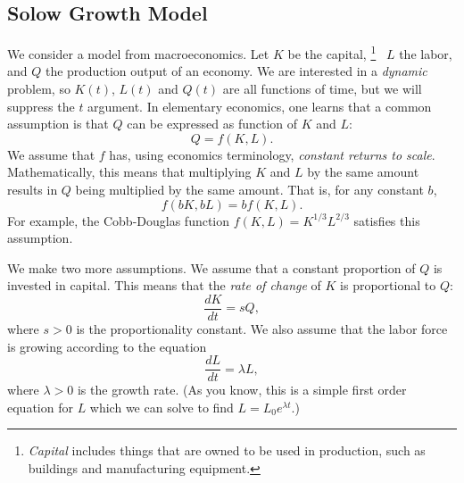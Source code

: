 \documentclass{book}
\begin{document}
\subsection{Solow Growth Model}
We consider a model from macroeconomics.
Let $K$ be the capital,%
\footnote{\emph{Capital} includes things that are owned to be used
in production, such as buildings and manufacturing equipment.}%
~$L$ the labor, and $Q$ the production output of an economy.
We are interested in a \emph{dynamic} problem, so $K(t)$, $L(t)$ and
$Q(t)$ are all functions of time, but we will suppress the $t$ argument.
In elementary economics, one learns that a common assumption is that
$Q$ can be expressed as function of $K$ and $L$:
\begin{equation}
   Q = f(K,L).
   \label{EQN:PROD}
\end{equation}
We assume that $f$ has, using economics terminology,
\emph{constant returns to scale}.  Mathematically, this means
that multiplying $K$ and $L$ by the same amount results in $Q$ being
multiplied by the same amount.  That is, for any constant $b$,
\[
   f(bK,bL) = bf(K,L).
\]
For example, the Cobb-Douglas function
$f(K,L) = K^{1/3}L^{2/3}$
satisfies this assumption. 

We make two more assumptions.
We assume that a constant proportion of $Q$ is invested in capital.
This means that the \emph{rate of change} of $K$ is proportional to
$Q$:
\begin{equation}
    \frac{dK}{dt} = s Q,
\label{EQN:DKDT}
\end{equation}
where $s > 0$ is the proportionality constant.
We also assume that the labor force is growing according
to the equation
\begin{equation}
   \frac{dL}{dt} = \lambda L,
   \label{EQN:DLDT}
\end{equation}
where $\lambda > 0$ is the growth rate.  (As you know, this is a simple
first order equation for $L$ which we can solve to find 
$L = L_0 e^{\lambda t}$.)
\end{document}

